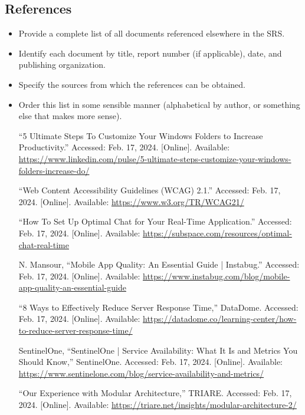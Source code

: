 \documentclass[]{article}
\begin{document}
\subsection{References}
\label{sub:references}
\begin{itemize}
    \item Provide a complete list of all documents referenced elsewhere in the SRS.
    \item Identify each document by title, report number (if applicable), date, and publishing organization.
    \item Specify the sources from which the references can be obtained.
    \item Order this list in some sensible manner (alphabetical by author, or something else that makes more sense).
    \begin{thebibliography}{99}
         “5 Ultimate Steps To Customize Your Windows Folders to Increase Productivity.” Accessed: Feb. 17, 2024. [Online]. Available: \url{https://www.linkedin.com/pulse/5-ultimate-steps-customize-your-windows-folders-increase-do/}
        
         “Web Content Accessibility Guidelines (WCAG) 2.1.” Accessed: Feb. 17, 2024. [Online]. Available: \url{https://www.w3.org/TR/WCAG21/}
        
         “How To Set Up Optimal Chat for Your Real-Time Application.” Accessed: Feb. 17, 2024. [Online]. Available: \url{https://subspace.com/resources/optimal-chat-real-time}
        
         N. Mansour, “Mobile App Quality: An Essential Guide | Instabug.” Accessed: Feb. 17, 2024. [Online]. Available: \url{https://www.instabug.com/blog/mobile-app-quality-an-essential-guide}
        
         “8 Ways to Effectively Reduce Server Response Time,” DataDome. Accessed: Feb. 17, 2024. [Online]. Available: \url{https://datadome.co/learning-center/how-to-reduce-server-response-time/}
        
         SentinelOne, “SentinelOne | Service Availability: What It Is and Metrics You Should Know,” SentinelOne. Accessed: Feb. 17, 2024. [Online]. Available: \url{https://www.sentinelone.com/blog/service-availability-and-metrics/}
        
         “Our Experience with Modular Architecture,” TRIARE. Accessed: Feb. 17, 2024. [Online]. Available: \url{https://triare.net/insights/modular-architecture-2/}
        

\end{thebibliography}
\end{itemize}
\end{document}
